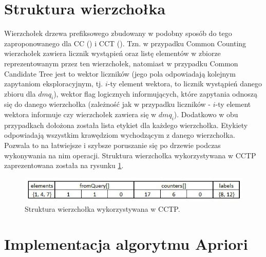 \section{Struktura wierzchołka}
\label{c43}
Wierzchołek drzewa prefiksowego zbudowany w podobny sposób do tego zaproponowanego dla CC (\cite{WojciechowskiCC}) i CCT (\cite{WojciechowskiCCT}). Tzn. w przypadku Common Counting wierzchołek zawiera licznik wystąpień oraz listę elementów w zbiorze reprezentowanym przez ten wierzchołek, natomiast w przypadku Common Candidate Tree jest to wektor liczników (jego pola odpowiadają kolejnym zapytaniom eksploracyjnym, tj. \(i\)-ty element wektora, to licznik wystąpień danego zbioru dla \(dmq_i\)), wektor flag logicznych informujących, które zapytania odnoszą się do danego wierzchołka (zależność jak w przypadku liczników - \(i\)-ty element wektora informuje czy wierzchołek zawiera się w \(dmq_i\)). Dodatkowo w obu przypadkach dołożona została lista etykiet dla każdego wierzchołka. Etykiety odpowiadają wszystkim krawędziom wychodzącym z danego wierzchołka. Pozwala to na łatwiejsze i szybsze poruszanie się po drzewie podczas wykonywania na nim operacji. Struktura wierzchołka wykorzystywana w CCTP zaprezentowana została na rysunku \ref{fig:nodeCCTP}.
\begin{figure}[h]
	\centering
	\includegraphics[width=0.8\linewidth]{figures/node}
	\caption{Struktura wierzchołka wykorzystywana w CCTP.}
	\label{fig:nodeCCTP}
\end{figure}

\section{Implementacja algorytmu Apriori}
\label{c44}

